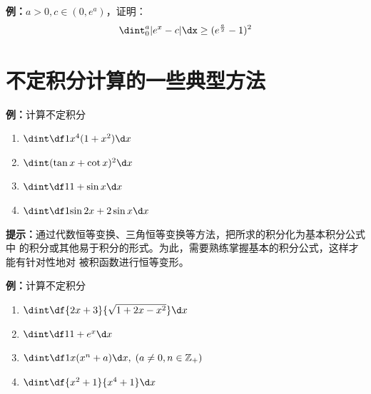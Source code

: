 {\bf 例：}$a>0,c\in(0,e^a)$，证明：
$$\dint_0^a|e^x-c|\dx\geq(e^{\frac a2}-1)^2$$

\newpage

\section[不定积分计算的一些典型方法]{不定积分计算的一些典型方法}

{\bf 例：}计算不定积分
\begin{enumerate}[(1)]
  \setlength{\itemindent}{1cm}
  \item $\dint\df1{x^4(1+x^2)}\d x$
  \item $\dint(\tan x+\cot x)^2\d x$
  \item $\dint\df1{1+\sin x}\d x$
  \item $\dint\df1{\sin2x+2\sin x}\d x$
\end{enumerate}

% 
% 
% 
% 
% 
% 

\begin{shaded}

{\bf 提示：}通过代数恒等变换、三角恒等变换等方法，把所求的积分化为基本积分公式中
的积分或其他易于积分的形式。为此，需要熟练掌握基本的积分公式，这样才能有针对性地对
被积函数进行恒等变形。

\end{shaded}

{\bf 例：}计算不定积分
\begin{enumerate}[(1)]
  \setlength{\itemindent}{1cm}
  \item $\dint\df{2x+3}{\sqrt{1+2x-x^2}}\d x$
  \item $\dint\df1{1+e^x}\d x$
  \item $\dint\df1{x(x^n+a)}\d x,\;(a\ne 0,n\in\mathbb{Z}_+)$
  \item $\dint\df{x^2+1}{x^4+1}\d x$
\end{enumerate}

